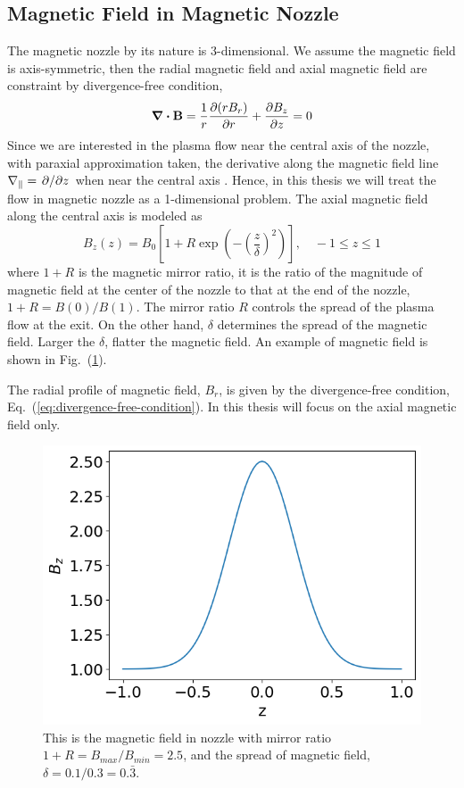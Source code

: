 \subsection{Magnetic Field in Magnetic Nozzle} \label{sec:magnetic-field-in-nozzle}
The magnetic nozzle by its nature is 3-dimensional. We assume the magnetic field is axis-symmetric, then the radial magnetic field and axial magnetic field are constraint by divergence-free condition,
\begin{equation}
	\div\mathbf{B} = \frac{1}{r}\pdv{(rB_r)}{r} + \pdv{B_z}{z} = 0
	\label{eq:divergence-free-condition}
\end{equation}
Since we are interested in the plasma flow near the central axis of the nozzle, with paraxial approximation taken, the derivative along the magnetic field line $\nabla_\parallel = \pdv*{z}$ when near the central axis \cite{smolyakov_quasineutral_2021}. Hence, in this thesis we will treat the flow in magnetic nozzle as a 1-dimensional problem. The axial magnetic field along the central axis is modeled as
\begin{equation}
	B_z(z) = B_0 \left[1 + R\exp(-\left(\frac{z}{\delta}\right)^2)\right], \quad -1\leq z \leq 1
\end{equation}
where $1+R$ is the magnetic mirror ratio, it is the ratio of the magnitude of magnetic field at the center of the nozzle to that at the end of the nozzle, $1+R = B(0)/B(1)$. The mirror ratio $R$ controls the spread of the plasma flow at the exit. On the other hand, $\delta$ determines the spread of the magnetic field. Larger the $\delta$, flatter the magnetic field. An example of magnetic field is shown in Fig.~(\ref{fig:magnetic-field}).

The radial profile of magnetic field, $B_r$, is given by the divergence-free condition, Eq.~(\ref{eq:divergence-free-condition}). In this thesis will focus on the axial magnetic field only.

\begin{figure}[htbp]
	\centering
	\includegraphics[width=0.7\linewidth]{figures/magnetic-field}
	\caption{This is the magnetic field in nozzle with mirror ratio $1+R=B_{max}/B_{min}=2.5$, and the spread of magnetic field, $\delta=0.1/0.3=0.\bar{3}$. }
	\label{fig:magnetic-field}
\end{figure}

